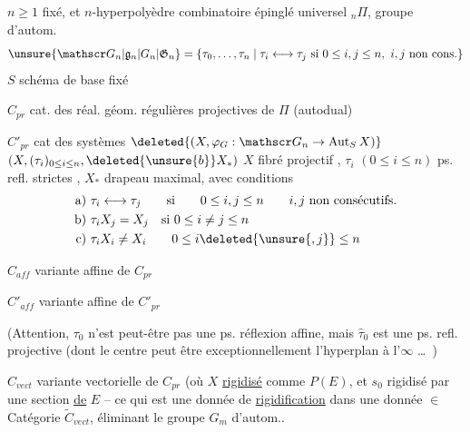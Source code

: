 $n\geqslant1$ fixé, et $n$-hyperpolyèdre combinatoire épinglé universel $ {}_n\Pi$, groupe d'autom.
\[
\unsure{\mathscr G_n|\mathfrak g_n|G_n|\mathfrak G_n}=\{\tau_0,\ldots,\tau_n\mid \tau_i\longleftrightarrow\tau_j\text{ si }0\leq i,j\leq n,\ i,j\text{ non cons.}\}
\]
$S$ schéma de base fixé

 $C_{pr}$ cat. des réal. géom. régulières  projectives de $\Pi$ (autodual)

 $C'_{pr}$ cat des systèmes $\deleted{(X,\varphi_G:\mathscr G_n\to\operatorname{Aut}_S X)}$ $(X,(\tau_i)_{0\leq i\leq n},\deleted{\unsure{b}}X_*)$ $X$ fibré projectif , $\tau_i$ $(0\leq i\leq n)$ ps. refl. strictes ,  $X_*$ drapeau maximal, avec conditions
\[
\begin{aligned}
\text{a)}\ &\tau_i\longleftrightarrow\tau_j\qquad\text{si}\qquad 0\leq i,j\leq n\qquad i,j\text{ non consécutifs.}\\
\text{b)}\ &\tau_i X_j=X_j\quad\text{si }0\leq i\ne j\leq n\\
\text{c)}\ &\tau_i X_i\ne X_i\qquad 0\leq i\deleted{\unsure{,j}}\leq n
\end{aligned}
\]

 $C_{aff}$ variante affine de $C_{pr}$

 $C'_{aff}$ variante affine de $C'_{pr}$ 

(Attention, $\tau_0$ n'est peut-être pas une ps. réflexion affine, mais $\widehat\tau_0$ est une ps. refl. projective (dont le  centre peut être exceptionnellement l'hyperplan à l'$\infty$ \ldots\ )

 $C_{vect}$ variante vectorielle de $C_{pr}$ (où $X$ \uline{rigidisé} comme $P(E)$, et $s_0$ rigidisé par une section \uline{de} $E$ -- ce qui  est une donnée de \uline{rigidification} dans une donnée $\in$ Catégorie $\widetilde C_{vect}$, éliminant le groupe $G_m$ d'autom..


